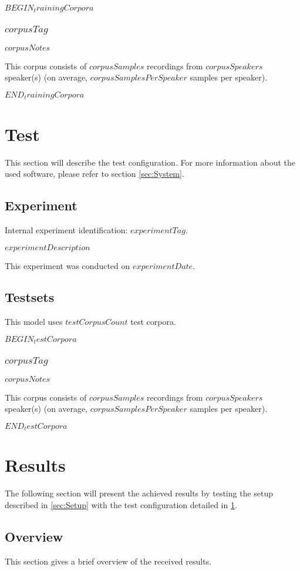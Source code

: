 \documentclass[a4paper,10pt,bibtotoc]{scrartcl}
\begin{document}
\begin{multicols}{2}
$BEGIN_trainingCorpora$
\subsubsection{$corpusTag$}

$corpusNotes$

This corpus consists of $corpusSamples$ recordings from $corpusSpeakers$ speaker(s) (on average, $corpusSamplesPerSpeaker$ samples per speaker).

$END_trainingCorpora$

\section{Test}
\label{sec:Test}

This section will describe the test configuration. For more information about the used software, please refer to section \ref{sec:System}.

\subsection{Experiment}

Internal experiment identification: $experimentTag$.

$experimentDescription$

This experiment was conducted on $experimentDate$.

\subsection{Testsets}
\label{sec:Testsets}

This model uses $testCorpusCount$ test corpora.

$BEGIN_testCorpora$
\subsubsection{$corpusTag$}
\label{sec:$SAVE_corpusTag$}

$corpusNotes$

This corpus consists of $corpusSamples$ recordings from $corpusSpeakers$ speaker(s) (on average, $corpusSamplesPerSpeaker$ samples per speaker).

$END_testCorpora$


\section{Results}

The following section will present the achieved results by testing the setup described in \ref{sec:Setup} with the test configuration detailed in \ref{sec:Test}.

\subsection{Overview}

This section gives a brief overview of the received results.

\end{multicols}
\end{document}
